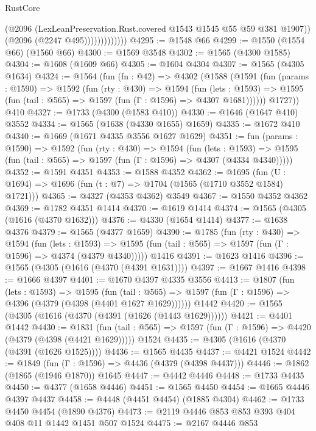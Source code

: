 \begin{lexlean}{RustCore}
\begin{coremodule}
                          (@2096 (LexLeanPreservation.Rust.covered @1543 @1545 @55 @59 @381 @1907))
                          (@2096 (@2247 @495)))))))))))))
@4295 := @1548 @66
@4299 := @1550 (@1554 @66) (@1560 @66)
@4300 := @1569 @3548
@4302 := @1565 (@4300 @1585)
@4304 := @1608 (@1609 @66)
@4305 := @1604 @4304
@4307 := @1565 (@4305 @1634)
@4324 := @1564
    (fun (fn : @42) =>
    @4302
      (@1588
        (@1591
          (fun (params : @1590) =>
          @1592
            (fun (rty : @430) =>
            @1594
              (fun (lets : @1593) =>
              @1595 (fun (tail : @565) => @1597 (fun (Γ : @1596) => @4307 @1681))))))
        @1727))
    @410
@4327 := @1733 (@4300 (@1583 @410))
@4330 := @1646 (@1647 @410) @3552
@4334 := @1565 (@1638 (@4330 @1655) @1659)
@4335 := @1672 @410
@4340 := @1669 (@1671 @4335 @3556 @1627 @1629)
@4351 := fun (params : @1590) =>
  @1592
    (fun (rty : @430) =>
    @1594
      (fun (lets : @1593) =>
      @1595 (fun (tail : @565) => @1597 (fun (Γ : @1596) => @4307 (@4334 @4340)))))
@4352 := @1591 @4351
@4353 := @1588 @4352
@4362 := @1695 (fun (U : @1694) => @1696 (fun (t : @7) => @1704 (@1565 (@1710 @3552 @1584) @1721)))
@4365 := @4327 (@4353 @4362) @3549
@4367 := @1550 @4352 @4362
@4369 := @1782 @4351 @1414
@4370 := @1619 @1414
@4374 := @1565 (@4305 (@1616 (@4370 @1632)))
@4376 := @4330 (@1654 @1414)
@4377 := @1638 @4376
@4379 := @1565 (@4377 @1659)
@4390 := @1785
    (fun (rty : @430) =>
    @1594
      (fun (lets : @1593) =>
      @1595 (fun (tail : @565) => @1597 (fun (Γ : @1596) => @4374 (@4379 @4340)))))
    @1416
@4391 := @1623 @1416
@4396 := @1565 (@4305 (@1616 (@4370 (@4391 @1631))))
@4397 := @1667 @1416
@4398 := @1666 @4397
@4401 := @1670 @4397 @4335 @3556
@4413 := @1807
    (fun (lets : @1593) =>
    @1595
      (fun (tail : @565) => @1597 (fun (Γ : @1596) => @4396 (@4379 (@4398 (@4401 @1627 @1629))))))
    @1442
@4420 := @1565 (@4305 (@1616 (@4370 (@4391 (@1626 (@1443 @1629))))))
@4421 := @4401 @1442
@4430 := @1831
    (fun (tail : @565) => @1597 (fun (Γ : @1596) => @4420 (@4379 (@4398 (@4421 @1629)))))
    @1524
@4435 := @4305 (@1616 (@4370 (@4391 (@1626 @1525))))
@4436 := @1565 @4435
@4437 := @4421 @1524
@4442 := @1849 (fun (Γ : @1596) => @4436 (@4379 (@4398 @4437)))
@4446 := @1862 (@1865 (@1946 @1870)) @1645
@4447 := @4442 @4446
@4448 := @1733 @4435
@4450 := @4377 (@1658 @4446)
@4451 := @1565 @4450
@4454 := @1665 @4446 @4397 @4437
@4458 := @4448 (@4451 @4454) (@1885 @4304)
@4462 := @1733 @4450 @4454 (@1890 @4376)
@4473 := @2119 @4446 @853 @853 @393 @404 @408 @11 @1442 @1451 @507 @1524
@4475 := @2167 @4446 @853

\end{coremodule}
\end{lexlean}
